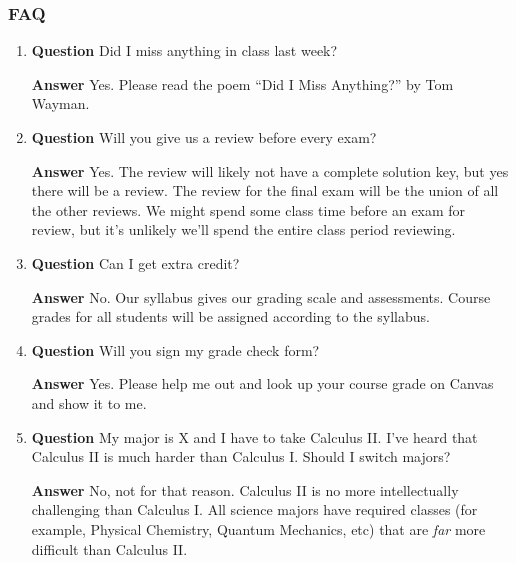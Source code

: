 \documentclass[12pt]{article}
\newcounter{ex}\setcounter{ex}{0}
\begin{document}
\subsubsection*{FAQ}


\begin{enumerate}

\item \textbf{Question} Did I miss anything in class last week?

\textbf{Answer} Yes.  Please read  the poem “Did I Miss Anything?” by Tom Wayman.  




\item  \textbf{Question}  Will you give us a review before every exam?

\textbf{Answer} Yes. The review will likely not have a complete solution key, but yes there will be a review. The review for the final exam will be the union of all the other reviews.  We might spend some class time before an exam for review, but it's unlikely we'll spend the entire class period reviewing. 

\item  \textbf{Question}  Can I get extra credit?

\textbf{Answer} No. Our syllabus gives our grading scale and assessments. Course grades for all students will be
assigned according to the syllabus.

\item  \textbf{Question}  Will you sign my grade check form?

\textbf{Answer} Yes.  Please help me out and look up your course grade on Canvas and show it to me.

\item  \textbf{Question}  My major is X and I have to take Calculus II.  I've heard that Calculus II is much harder than Calculus I.  Should I switch majors?

 \textbf{Answer}  No, not for that reason. Calculus II is no more intellectually challenging than Calculus I. All science majors have required classes (for example, Physical Chemistry, Quantum Mechanics, etc) that
are \emph{far} more difficult than Calculus II. 


\end{enumerate}
\end{document}
